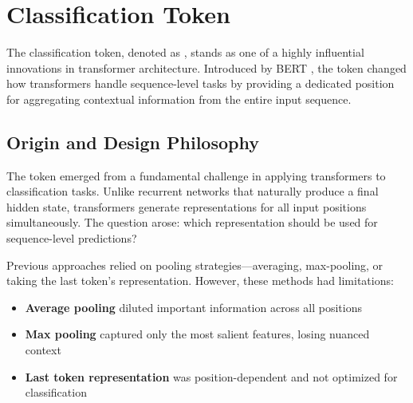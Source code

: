 \section{Classification Token \cls{}}

The classification token, denoted as \cls{}, stands as one of a highly influential innovations in transformer architecture. Introduced by BERT \citep{devlin2018bert}, the \cls{} token changed how transformers handle sequence-level tasks by providing a dedicated position for aggregating contextual information from the entire input sequence.

\subsection{Origin and Design Philosophy}

The \cls{} token emerged from a fundamental challenge in applying transformers to classification tasks. Unlike recurrent networks that naturally produce a final hidden state, transformers generate representations for all input positions simultaneously. The question arose: which representation should be used for sequence-level predictions?

Previous approaches relied on pooling strategies---averaging, max-pooling, or taking the last token's representation. However, these methods had limitations:

\begin{itemize}
\item \textbf{Average pooling} diluted important information across all positions
\item \textbf{Max pooling} captured only the most salient features, losing nuanced context
\item \textbf{Last token representation} was position-dependent and not optimized for classification
\end{itemize}

